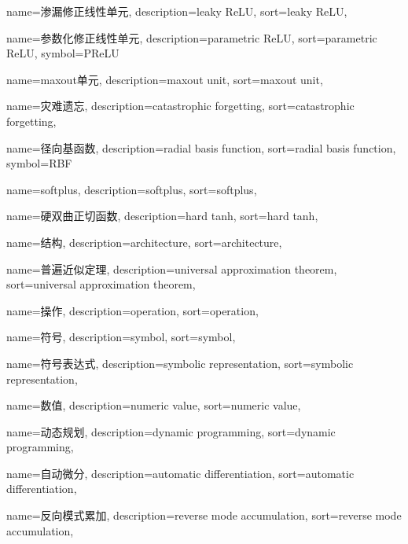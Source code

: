 {
  name=渗漏修正线性单元,
  description={leaky ReLU},
  sort={leaky ReLU},
}

{
  name=参数化修正线性单元,
  description={parametric ReLU},
  sort={parametric ReLU},
  symbol={PReLU}
}

{
  name=maxout单元,
  description={maxout unit},
  sort={maxout unit},
}

{
  name=灾难遗忘,
  description={catastrophic forgetting},
  sort={catastrophic forgetting},
}

{
  name=径向基函数,
  description={radial basis function},
  sort={radial basis function},
  symbol={RBF}
}

{
  name=softplus,
  description={softplus},
  sort={softplus},
}

{
  name=硬双曲正切函数,
  description={hard tanh},
  sort={hard tanh},
}

{
  name=结构,
  description={architecture},
  sort={architecture},
}

{
  name=普遍近似定理, %
  description={universal approximation theorem},
  sort={universal approximation theorem},
}

{
  name=操作,
  description={operation},
  sort={operation},
}

{
  name=符号,
  description={symbol},
  sort={symbol},
}

{
  name=符号表达式,
  description={symbolic representation},
  sort={symbolic representation},
}

{
  name=数值,
  description={numeric value},
  sort={numeric value},
}

{
  name=动态规划,
  description={dynamic programming},
  sort={dynamic programming},
}

{
  name=自动微分,
  description={automatic differentiation},
  sort={automatic differentiation},
}

{
  name=反向模式累加,
  description={reverse mode accumulation},
  sort={reverse mode accumulation},
}

